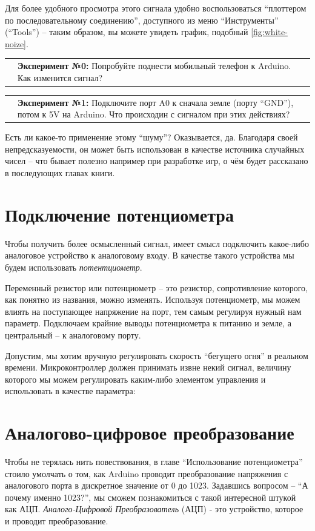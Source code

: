 \documentclass[a4paper,twoside]{book}
\newcommand{\experiment}[2]{
  \vspace{8pt}
  \begin{tabularx}{\textwidth}{m{1cm} m{9cm}}
    
    & \textbf{Эксперимент №#1:} #2 \\
  \end{tabularx}
}
\begin{document}
Для более удобного просмотра этого сигнала удобно воспользоваться ``плоттером по
последовательному соединению'', доступного из меню ``Инструменты'' (``Tools'') --
таким образом, вы можете увидеть график, подобный \ref{fig:white-noize}.

\experiment{0}{Попробуйте поднести мобильный телефон к Arduino.  Как изменится
  сигнал?}

\experiment{1}{Подключите порт A0 к сначала земле (порту ``GND''), потом к 5V на
  Arduino.  Что происходин с сигналом при этих действиях?}

Есть ли какое-то применение этому ``шуму''?  Оказывается, да.  Благодаря своей
непредсказуемости, он может быть использован в качестве источника случайных
чисел -- что бывает полезно например при разработке игр, о чём будет рассказано в
последующих главах книги.

\section{Подключение потенциометра}

Чтобы получить более осмысленный сигнал, имеет смысл подключить какое-либо
аналоговое устройство к аналоговому входу.  В качестве такого устройства мы
будем использовать \emph{потентциометр}.

Переменный резистор или потенциометр -- это резистор, сопротивление которого, как
понятно из названия, можно изменять. Используя потенциометр, мы можем влиять на
поступающее напряжение на порт, тем самым регулируя нужный нам параметр.
Подключаем крайние выводы потенциометра к питанию и земле, а центральный -- к
аналоговому порту.

Допустим, мы хотим вручную регулировать скорость ``бегущего огня'' в реальном
времени. Микроконтроллер должен принимать извне некий сигнал, величину которого
мы можем регулировать каким-либо элементом управления и использовать в качестве
параметра:

\section{Аналогово-цифровое преобразование}

Чтобы не терялась нить повествования, в главе ``Использование потенциометра''
стоило умолчать о том, как Arduino проводит преобразование напряжения с
аналогового порта в дискретное значение от 0 до 1023. Задавшись вопросом -- ``А
почему именно 1023?'', мы сможем познакомиться с такой интересной штукой как
АЦП. \emph{Аналого-Цифровой Преобразователь} (АЦП) - это устройство, которое и
проводит преобразование.
\end{document}
